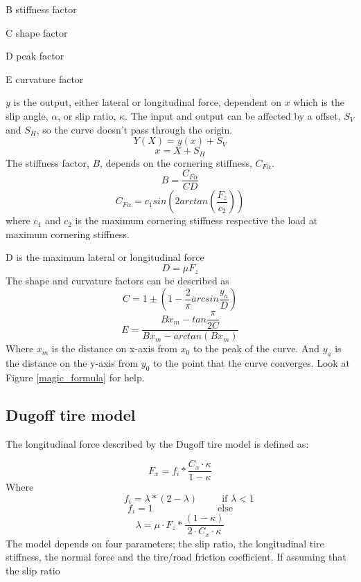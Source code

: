 B stiffness factor

C shape factor

D peak factor

E curvature factor

$ y $ is the output, either lateral or longitudinal force, dependent on $ x $ which is the slip angle, $ \alpha $, or slip ratio, $ \kappa $. The input and output can be affected by a offset, $ S_{V} $ and $ S_{H} $, so the curve doesn't pass through the origin.
\begin{equation}
	Y(X) = y(x) + S_{V}
\end{equation}
\begin{equation}
	x = X + S_{H}
\end{equation}
The stiffness factor, $ B $, depends on the cornering stiffness, $ C_{F\alpha} $.
\begin{equation}
	B = \dfrac{C_{F\alpha}}{CD}
\end{equation}
\begin{equation}
	C_{F\alpha} = c_{1}sin(2arctan(\dfrac{F_{z}}{c_{2}}))
\end{equation}
where $ c_{1} $ and $ c_{2} $ is the maximum cornering stiffness respective the load at maximum cornering stiffness.

D is the maximum lateral or longitudinal force
\begin{equation}
	D = \mu F_{z}
\end{equation}
The shape and curvature factors can be described as
\begin{equation}
	C = 1 \pm (1 - \dfrac{2}{\pi}arcsin\dfrac{y_{a}}{D})
\end{equation}
\begin{equation}
	E = \dfrac{Bx_{m} - tan{\dfrac{\pi}{2C}}}{Bx_{m} - arctan(Bx_{m})}
\end{equation}
Where $ x_{m} $ is the distance on x-axis from $ x_{0} $ to the peak of the curve. And $ y_{a} $ is the distance on the y-axis from $ y_{0} $ to the point that the curve converges. Look at Figure \ref{magic_formula} for help.
\subsection{Dugoff tire model}
The longitudinal force described by the Dugoff tire model is defined as:

\begin{equation}
F_{x} = f_{i}*\frac{C_{x} \cdot \kappa}{1-\kappa}
\end{equation}
Where
\begin{equation}
\;\;\;\;\;\;\, f_{i} = \lambda*(2-\lambda) \;\;\;\;\;\;\;\;\; \text{if } \lambda < 1
\end{equation}
\begin{equation}
f_{i} = 1 \;\;\;\;\;\;\;\;\;\;\;\;\;\;\;\;\;\;\;\;\;\;\;\; \text{else}
\end{equation}
\begin{equation}
 \lambda = \mu \cdot F_{z} * \frac{(1-\kappa)}{2 \cdot C_{x} \cdot \kappa}
\end{equation}
The model depends on four parameters; the slip ratio, the longitudinal tire stiffness, the normal force and the tire/road friction coefficient. If assuming that the slip ratio 


